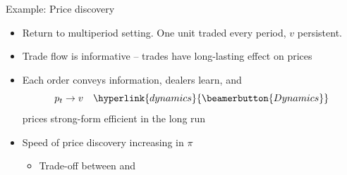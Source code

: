 \documentclass[english,10pt]{beamer}
\begin{document}


\begin{frame}[label=example]{Example: Price discovery}
\begin{itemize}
	\item Return to multiperiod setting. One unit traded every period, $v$ persistent.
	\item Trade flow is \alert{informative} -- trades have long-lasting effect on prices
	\item Each order conveys information, dealers learn, and 
	$$p_t \rightarrow v \quad
	\hyperlink{dynamics}{\beamerbutton{Dynamics}} $$
	prices \alert{strong-form efficient} in the long run
	\pause
	\item Speed of price discovery increasing in $\pi$
	\begin{itemize}
		\item Trade-off between  and 
	\end{itemize}
\end{itemize}
\end{frame}
\end{document}
